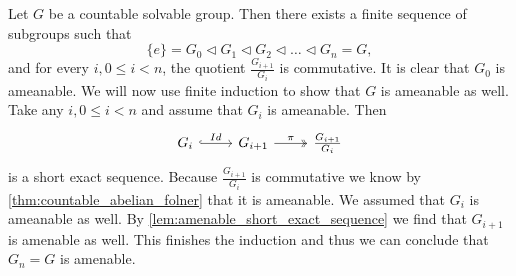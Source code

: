 Let $G$ be a countable solvable group. Then there exists a finite sequence of subgroups such that 
$$\{e\} = G_0 \triangleleft G_1 \triangleleft G_2 \triangleleft \dots \triangleleft G_n = G,$$ and for every $i, 0\le i<n$, the quotient $\frac{G_{i+1}}{G_i}$ is commutative. 
It is clear that $G_0$ is ameanable. We will now use finite induction to show that $G$ is ameanable as well. 
Take any $i, 0\le i<n$ and assume that $G_i$ is ameanable. Then 
\[\begin{tikzcd}
    G_i \arrow[r, "Id", hook] & G_{i+1} \arrow[r, "\pi", two heads] & \frac{G_{i+1}}{G_i}
    \end{tikzcd}\]
is a short exact sequence. Because $\frac{G_{i+1}}{G_i}$ is commutative we know by \cref{thm:countable_abelian_folner} that it is ameanable. We assumed that $G_i$ is ameanable as well. By \cref{lem:amenable_short_exact_sequence} we find that $G_{i+1}$ is amenable as well. This finishes the induction and thus we can conclude that $G_n = G$ is amenable.
